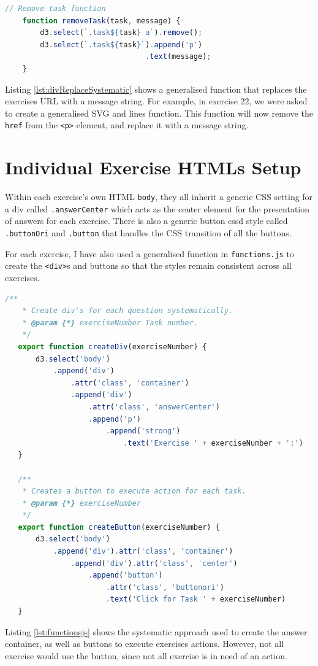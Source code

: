 \documentclass{scrreprt}
\begin{document}
\begin{lstlisting}[language=JavaScript,
    caption={Systematic <a>-text Replacement},
    captionpos=b,
    label={lst:divReplaceSystematic}]
    // Remove task function
    function removeTask(task, message) {
        d3.select(`.task${task} a`).remove();
        d3.select(`.task${task}`).append('p')
                                .text(message);
    }
\end{lstlisting}
Listing \ref{lst:divReplaceSystematic} shows a generalised function that replaces the exercises URL
with a message string. For example, in exercise 22, we were asked to create a generalised SVG and
lines function. This function will now remove the \verb|href| from the \verb|<p>| element, and replace
it with a message string.


\newpage
\section{Individual Exercise HTMLs Setup}
Within each exercise's own HTML \verb|body|, they all inherit a generic CSS setting for a div called
\verb|.answerCenter| which acts as the center element for the presentation of answers for each
exercise. There is also a generic button cssd style called \verb|.buttonOri| and \verb|.button| that
handles the CSS transition of all the buttons. \\
\par For each exercise, I have also used a generalised function in \verb|functions.js| to create the
\verb|<div>|s and buttons so that the styles remain consistent across all exercises.\\
\begin{lstlisting}[language=JavaScript,
    caption={Systematic div and button creation},
    captionpos=b,
    label={lst:functionsjs}]
    /**
    * Create div's for each question systematically.
    * @param {*} exerciseNumber Task number.
    */
   export function createDiv(exerciseNumber) {
       d3.select('body')
           .append('div')
               .attr('class', 'container')
               .append('div')
                   .attr('class', 'answerCenter')
                   .append('p')
                       .append('strong')
                           .text('Exercise ' + exerciseNumber + ':')
   }
   
   /**
    * Creates a button to execute action for each task.
    * @param {*} exerciseNumber 
    */
   export function createButton(exerciseNumber) {
       d3.select('body')
           .append('div').attr('class', 'container')
               .append('div').attr('class', 'center')
                   .append('button')
                       .attr('class', 'buttonori')
                       .text('Click for Task ' + exerciseNumber)
   }
\end{lstlisting}
Listing \ref{lst:functionsjs} shows the systematic approach used to create the answer container, 
as well as buttons to execute exercises actions. However, not all exercise would use the button,
since not all exercise is in need of an action.
\end{document}
